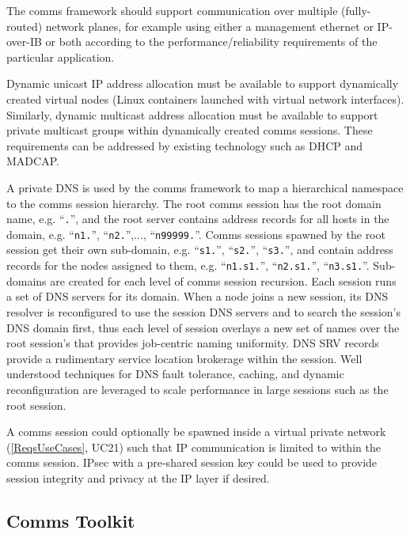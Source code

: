 The comms framework should support communication over multiple
(fully-routed) network planes, for example using either a management
ethernet or IP-over-IB or both according to the performance/reliability
requirements of the particular application.

Dynamic unicast IP address allocation must be available to support
dynamically created virtual nodes (Linux containers launched with
virtual network interfaces).  Similarly,
dynamic multicast address allocation must be available to support
private multicast groups within dynamically created comms sessions.
These requirements can be addressed by existing technology such as
DHCP\cite{rfc2131} and MADCAP\cite{rfc2730}.

A private DNS\cite{rfc1034} is used by the comms framework to
map a hierarchical namespace to the comms session hierarchy.
The root comms session has the root domain name, e.g. ``{\tt \ngrm.}'',
and the root server contains address records for all hosts in the domain, e.g.
``{\tt n1.\ngrm}'', ``{\tt n2.\ngrm}'',..., ``{\tt n99999.\ngrm}''.
Comms sessions spawned by the root session get their own sub-domain, e.g.
``{\tt s1.\ngrm}'', ``{\tt s2.\ngrm}'', ``{\tt s3.\ngrm}'',
and contain address records for the nodes assigned to them, e.g.
``{\tt n1.s1.\ngrm}'', ``{\tt n2.s1.\ngrm}'', ``{\tt n3.s1.\ngrm}''.
Sub-domains are created for each level of comms session recursion.
Each session runs a set of DNS servers for its domain.
When a node joins a new session, its DNS resolver is reconfigured to use
the session DNS servers and to search the session's DNS domain first,
thus each level of session overlays a new set of names over
the root session's that provides job-centric naming uniformity.
DNS SRV records\cite{rfc2782} provide a rudimentary service location
brokerage within the session.
Well understood techniques for DNS fault tolerance,
caching, and dynamic reconfiguration are leveraged to scale performance
in large sessions such as the root session.

A comms session could optionally be spawned inside a virtual private
network (\ref{ReqsUseCases}, UC21) such that IP communication
is limited to within the comms session.  IPsec\cite{rfc2401} with
a pre-shared session key could be used to provide session integrity and
privacy at the IP layer if desired.

\subsection{Comms Toolkit}

